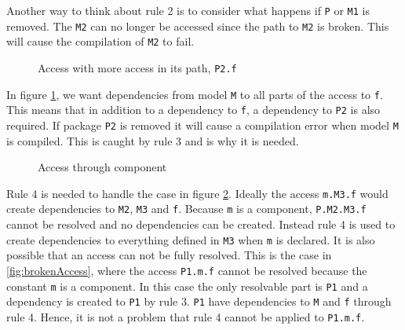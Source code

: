 \documentclass{cslthse-msc}
\begin{document}
Another way to think about rule 2 is to consider what happens if \texttt{P} or \texttt{M1} is removed. The \texttt{M2} can no longer be accessed since the path to \texttt{M2} is broken. This will cause the compilation of \texttt{M2} to fail.

\begin{figure}[!htbp]
    \centering
    \qquad
    \caption{Access with more access in its path, \texttt{P2.f}}
    \label{fig:dotAccess}
\end{figure}

In figure \ref{fig:dotAccess}, we want dependencies from model \texttt{M} to all parts of the access to \texttt{f}. This means that in addition to a dependency to \texttt{f}, a dependency to \texttt{P2} is also required. If package \texttt{P2} is removed it will cause a compilation error when model \texttt{M} is compiled. This is caught by rule 3 and is why it is needed.


\begin{figure}[!htbp]
    \centering
    \qquad
    \subfloat{\raisebox{4.7 cm}{}}
    \caption{Access through component}
    \label{fig:component}
\end{figure}

Rule 4 is needed to handle the case in figure \ref{fig:component}. Ideally the access \texttt{m.M3.f} would create dependencies to \texttt{M2}, \texttt{M3} and \texttt{f}. Because \texttt{m} is a component, \texttt{P.M2.M3.f} cannot be resolved and no dependencies can be created. Instead rule 4 is used to create dependencies to everything defined in \texttt{M3} when \texttt{m} is declared.
It is also possible that an access can not be fully resolved. This is the case in \ref{fig:brokenAccess}, where the access \texttt{P1.m.f} cannot be resolved because the constant \texttt{m} is a component. In this case the only resolvable part is \texttt{P1} and a  dependency is created to \texttt{P1} by rule 3. \texttt{P1} have dependencies to \texttt{M} and \texttt{f} through rule 4. Hence, it is not a problem that rule 4 cannot be applied to \texttt{P1.m.f}.
\end{document}
